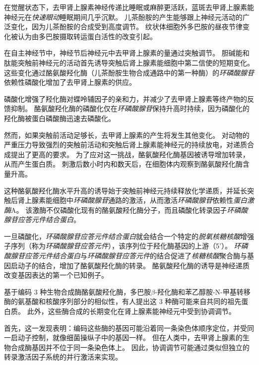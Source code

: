 \begin{proposition}[儿茶酚胺的产生随神经元活动而变化] \label{box:16_1}
	
	\quad \quad 在觉醒状态下，去甲肾上腺素神经传递比睡眠或麻醉更活跃，蓝斑去甲肾上腺素能神经元在\textit{快速眼动}睡眠期间几乎沉默。
	儿茶酚胺的产生能够跟上神经元活动的广泛变化，因为儿茶酚胺的合成受到高度调节。
	纹状体细胞外多巴胺的昼夜节律变化被认为由多巴胺摄取转运蛋白活性的改变引起。
	
	\quad \quad 在自主神经节中，神经节后神经元中去甲肾上腺素的量通过突触调节。
	胆碱能和肽能突触前神经元的活动首先诱导突触后肾上腺素能细胞中第二信使的短期变化。
	这些变化通过酪氨酸羟化酶（儿茶酚胺生物合成通路中的第一种酶）的\textit{环磷酸腺苷}依赖性磷酸化增加了去甲肾上腺素的供应。
	
	\quad \quad 磷酸化增强了羟化酶对蝶呤辅因子的亲和力，并减少了去甲肾上腺素等终产物的反馈抑制。
	酪氨酸羟化酶的磷酸化仅在\textit{环磷酸腺苷}保持升高时持续，因为磷酸化的羟化酶被蛋白磷酸酶迅速去磷酸化。
	
	\quad \quad 然而，如果突触前活动足够长，去甲肾上腺素的产生将发生其他变化。
	对动物的严重压力导致强烈的突触前活动和突触后肾上腺素能神经元的持续放电，对递质合成提出了更高的要求。
	为了应对这一挑战，酪氨酸羟化酶基因被诱导增加转录，从而产生蛋白质。
	刺激后数小时内和数天后，在细胞体内观察到酪氨酸羟化酶含量升高。
	
	\quad \quad 这种酪氨酸羟化酶水平升高的诱导始于突触前神经元持续释放化学递质，并延长突触后肾上腺素能细胞中\textit{环磷酸腺苷}通路的激活，从而激活\textit{环磷酸腺苷}依赖性\textit{蛋白激酶}A。
	该激酶不仅磷酸化现有的酪氨酸羟化酶分子，而且磷酸化转录因子\textit{环磷酸腺苷应答元件结合蛋白}。
	
	\quad \quad 一旦磷酸化，\textit{环磷酸腺苷应答元件结合蛋白}就会结合一个特定的\textit{脱氧核糖核酸}增强子序列（称为\textit{环磷酸腺苷应答元件}），该序列位于羟化酶基因的上游（5'）。
	\textit{环磷酸腺苷应答元件结合蛋白}与\textit{环磷酸腺苷应答元件}的结合促进了\textit{核糖核酸}聚合酶与基因启动子的结合，增加了酪氨酸羟化酶的转录。
	酪氨酸羟化酶的诱导是神经递质改变基因表达的第一个已知例子。
	
	\quad \quad 基于编码 3 种生物合成酶酪氨酸羟化酶，多巴胺$\beta$-羟化酶和苯乙醇胺-N-甲基转移酶的氨基酸和核酸序列部分的相似性，有人提出这 3 种酶可能来自共同的祖先蛋白质。
	此外，这些酶合成的长期变化在肾上腺素能神经元中受到协调调节。
	
	\quad \quad 首先，这一发现表明：编码这些酶的基因可能沿着同一条染色体顺序定位，并受同一启动子控制，就像细菌操纵子中的基因一样。
	但在人类中，去甲肾上腺素的生物合成酶基因并不位于同一条染色体上。
	因此，协调调节可能通过类似但独立的转录激活因子系统的并行激活来实现。
	
\end{proposition}



